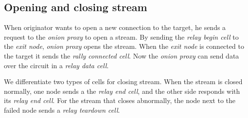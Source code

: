 \documentclass{acm_proc_article-sp}
\begin{document}
\subsection{Opening and closing stream}

When originator wants to open a new connection to the target, he sends a request to the \textit{onion proxy} to open a stream. By sending the \textit{relay begin cell} to the \textit{exit node}, \textit{onion proxy} opens the stream. When the \textit{exit node} is connected to the target it sends the \textit{rally connected cell}. Now the \textit{onion proxy} can send data over the circuit in a \textit{relay data cell}. \cite{cite6}

We differentiate two types of cells for closing stream. When the stream is closed normally, one node sends a the \textit{relay end cell}, and the other side responds with its \textit{relay end cell}. For the stream that closes abnormally, the node next to the failed node sends a \textit{relay teardown cell}. \cite{cite6}
\end{document}
